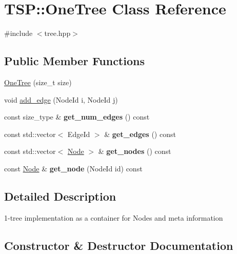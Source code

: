 \hypertarget{classTSP_1_1OneTree}{}\section{T\+SP\+:\+:One\+Tree Class Reference}
\label{classTSP_1_1OneTree}


{\ttfamily \#include $<$tree.\+hpp$>$}

\subsection*{Public Member Functions}
\begin{DoxyCompactItemize}
\item 
\hyperlink{classTSP_1_1OneTree_aa95506a53932cfbb19affc645e3e8f93}{One\+Tree} (size\+\_\+t size)
\item 
void \hyperlink{classTSP_1_1OneTree_a1fbf0dcc64bb859a04cd9d04298d8608}{add\+\_\+edge} (Node\+Id i, Node\+Id j)
\item 
\mbox{\label{classTSP_1_1OneTree_a300fb023cb38596fb8b1b239b73177f6}} 
const size\+\_\+type \& {\bfseries get\+\_\+num\+\_\+edges} () const
\item 
\mbox{\label{classTSP_1_1OneTree_aba5dd73526b09bef62ea76da2eccf173}} 
const std\+::vector$<$ Edge\+Id $>$ \& {\bfseries get\+\_\+edges} () const
\item 
\mbox{\label{classTSP_1_1OneTree_ae7205c7ed74ea5fe2542ffa1dbaf3a3d}} 
const std\+::vector$<$ \hyperlink{classTSP_1_1Node}{Node} $>$ \& {\bfseries get\+\_\+nodes} () const
\item 
\mbox{\label{classTSP_1_1OneTree_afed2f07e835853ba59bb37bd65991f44}} 
const \hyperlink{classTSP_1_1Node}{Node} \& {\bfseries get\+\_\+node} (Node\+Id id) const
\end{DoxyCompactItemize}


\subsection{Detailed Description}
1-\/tree implementation as a container for Nodes and meta information 

\subsection{Constructor \& Destructor Documentation}
\mbox{\label{classTSP_1_1OneTree_aa95506a53932cfbb19affc645e3e8f93}} 
